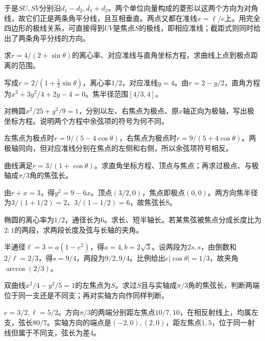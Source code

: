 于是\(SU,SV\)分别沿\(d_1-d_2,d_1+d_2\)。两个单位向量构成的菱形以这两个方向为对角线，故它们正是两条角平分线，且互相垂直。两点又都在准线\(x=\ell/e\)上。用完全四边形的极线关系，可直接得到\(UV\)是焦点\(S\)的极线，即相应准线；截距式则同时给出了两条角平分线的方向。


求\(r=4/(2+\sin\theta)\)的离心率、对应准线与直角坐标方程，求曲线上点到极点距离的范围。
\par
\solutionanswer
写成\(r=2/(1+\frac12\sin\theta)\)，离心率\(1/2\)，对应准线\(y=4\)。由\(r=2-y/2\)，直角方程为\(x^2+3y^2/4+2y-4=0\)。焦半径范围\([4/3,4]\)。


对椭圆\(x^2/25+y^2/9=1\)，分别以左、右焦点为极点、原\(x\)轴正向为极轴，写出极坐标方程。说明两个方程中余弦项的符号为何不同。
\par
\solutionanswer
左焦点为极点时\(r=9/(5-4\cos\theta)\)，右焦点为极点时\(r=9/(5+4\cos\theta)\)。两极轴同向，但对应准线分别在焦点的左侧和右侧，所以余弦项符号相反。


曲线满足\(r=3/(1+\cos\theta)\)。求直角坐标方程、顶点与焦点；再求过极点、与极轴成\(\pi/3\)角的焦弦长。
\par
\solutionanswer
由\(r+x=3\)，得\(y^2=9-6x\)。顶点\((3/2,0)\)，焦点即极点\((0,0)\)。两方向焦半径为\(3/(1+1/2)=2\)、\(3/(1-1/2)=6\)，故焦弦长\(8\)。


椭圆的离心率为\(1/2\)，通径长为\(6\)。求长、短半轴长。若某焦弦被焦点分成长度比为\(2:1\)的两段，求两段长度及弦与长轴的夹角。
\par
\solutionanswer
半通径\(\ell=3=a(1-e^2)\)，得\(a=4,b=2\sqrt3\)。设两段为\(2s,s\)，由倒数和\(2/\ell=2/3\)，得\(s=9/4\)，两段为\(9/2,9/4\)。比例给出\(e|\cos\theta|=1/3\)，故夹角\(\arccos(2/3)\)。


双曲线\(x^2/4-y^2/5=1\)的左焦点为\(S\)。求过\(S\)且与实轴成\(\pi/3\)角的焦弦长，判断两端位于同一支还是不同支；再对实轴方向作同样判断。
\par
\solutionanswer
\(e=3/2,\ell=5/2\)。方向\(\pi/3\)的两端分别距左焦点\(10/7,10\)，在相反射线上，均属左支，弦长\(80/7\)。实轴方向的端点是\((-2,0),(2,0)\)，距左焦点\(1,5\)，位于同一射线但属于不同支，弦长为差\(4\)。


